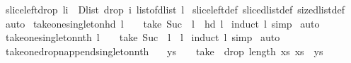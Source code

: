 \begin{isabellebody}
\isanewline
%
\endisadelimproof
\isanewline
{}\isamarkupfalse%
\ slice{\isacharunderscore}left{\isacharunderscore}drop{\isacharcolon}\ {\isachardoublequoteopen}l{\isasymdagger}i{\isachardot}{\isachardot}\ {\isacharequal}\ Dlist\ {\isacharparenleft}drop\ i\ {\isacharparenleft}list{\isacharunderscore}of{\isacharunderscore}dlist\ l{\isacharparenright}{\isacharparenright}{\isachardoublequoteclose}\isanewline
%
\isadelimproof
%
\endisadelimproof
%
\isatagproof
{}\isamarkupfalse%
\ slice{\isacharunderscore}left{\isacharunderscore}def\ slice{\isacharunderscore}dlist{\isacharunderscore}def\ size{\isacharunderscore}dlist{\isacharunderscore}def\isanewline
{}\isamarkupfalse%
\ auto%
\endisatagproof
{\isafoldproof}%
%
\isadelimproof
\isanewline
%
\endisadelimproof
\isanewline
{}\isamarkupfalse%
\ take{\isacharunderscore}one{\isacharunderscore}singleton{\isacharunderscore}hd{\isacharcolon}\ {\isachardoublequoteopen}l\ {\isasymnoteq}\ {\isacharbrackleft}{\isacharbrackright}\ {\isasymLongrightarrow}\ take\ {\isacharparenleft}Suc\ {}{\isacharparenright}\ l\ {\isacharequal}\ {\isacharbrackleft}hd\ l{\isacharbrackright}{\isachardoublequoteclose}\isanewline
%
\isadelimproof
%
\endisadelimproof
%
\isatagproof
{}\isamarkupfalse%
\ {\isacharparenleft}induct\ l{\isacharcomma}\ simp{\isacharparenright}\isanewline
{}\isamarkupfalse%
\ auto%
\endisatagproof
{\isafoldproof}%
%
\isadelimproof
\isanewline
%
\endisadelimproof
\isanewline
{}\isamarkupfalse%
\ take{\isacharunderscore}one{\isacharunderscore}singleton{\isacharunderscore}nth{\isacharcolon}\ {\isachardoublequoteopen}l\ {\isasymnoteq}\ {\isacharbrackleft}{\isacharbrackright}\ {\isasymLongrightarrow}\ take\ {\isacharparenleft}Suc\ {}{\isacharparenright}\ l\ {\isacharequal}\ {\isacharbrackleft}l{\isacharbang}{}{\isacharbrackright}{\isachardoublequoteclose}\isanewline
%
\isadelimproof
%
\endisadelimproof
%
\isatagproof
{}\isamarkupfalse%
\ {\isacharparenleft}induct\ l{\isacharcomma}\ simp{\isacharparenright}\isanewline
{}\isamarkupfalse%
\ auto%
\endisatagproof
{\isafoldproof}%
%
\isadelimproof
\isanewline
%
\endisadelimproof
\isanewline
{}\isamarkupfalse%
\ take{\isacharunderscore}one{\isacharunderscore}drop{\isacharunderscore}n{\isacharunderscore}append{\isacharunderscore}singleton{\isacharunderscore}nth{\isacharcolon}\ \isanewline
\ \ {\isachardoublequoteopen}ys\ {\isasymnoteq}\ {\isacharbrackleft}{\isacharbrackright}\ {\isasymLongrightarrow}\ take\ {}\ {\isacharparenleft}drop\ {\isacharparenleft}length\ xs{\isacharparenright}\ {\isacharparenleft}xs\ {\isacharat}\ ys{\isacharparenright}{\isacharparenright}\ {\isacharequal}\ \isanewline

\end{isabellebody}

